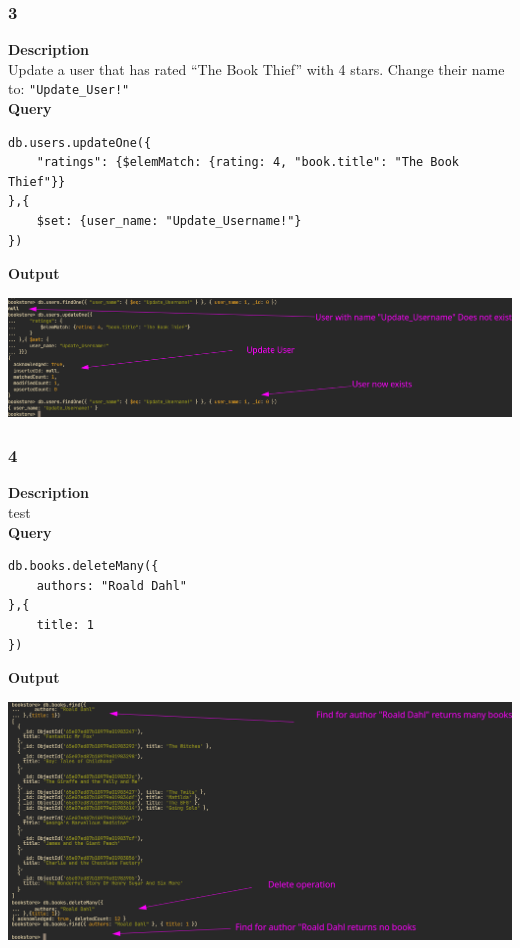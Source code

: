 \documentclass[11pt]{article}
\begin{document}
\subsubsection{3}
\label{sec:orgcc45bf3}
\textbf{Description}\\
Update a user that has rated ``The Book Thief'' with 4 stars. Change their name to: \texttt{"Update\_User!"}\\
\linebreak
\textbf{Query}
\begin{verbatim}
db.users.updateOne({
    "ratings": {$elemMatch: {rating: 4, "book.title": "The Book Thief"}}
},{
    $set: {user_name: "Update_Username!"}
})
\end{verbatim}
\linebreak
\textbf{Output}\\
\begin{center}
\includegraphics[width=1\textwidth]{images/CRGMAT002/3.png}
\end{center}
\pagebreak
\subsubsection{4}
\label{sec:org2e97d3c}
\textbf{Description}\\
test\\
\linebreak
\textbf{Query}
\begin{verbatim}
db.books.deleteMany({
    authors: "Roald Dahl"
},{
    title: 1
})
\end{verbatim}

\linebreak
\textbf{Output}\\
\begin{center}
\includegraphics[width=1\textwidth]{images/CRGMAT002/4.png}
\end{center}
\pagebreak
\end{document}
